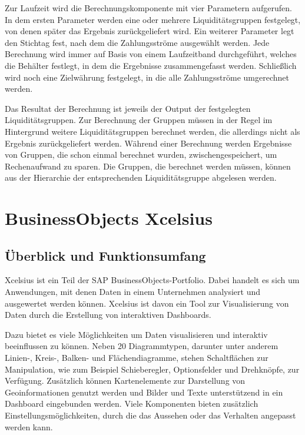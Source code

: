 \begin{onehalfspacing}
\label{sec:berechnungskomponente:parameter}
Zur Laufzeit wird die Berechnungskomponente mit vier Parametern aufgerufen. In dem ersten Parameter werden eine oder mehrere Liquiditätsgruppen festgelegt, von denen später das Ergebnis zurückgeliefert wird. Ein weiterer Parameter legt den Stichtag fest, nach dem die Zahlungsströme ausgewählt werden. Jede Berechnung wird immer auf Basis von einem Laufzeitband durchgeführt, welches die Behälter festlegt, in dem die Ergebnisse zusammengefasst werden. Schließlich wird noch eine Zielwährung festgelegt, in die alle Zahlungsströme umgerechnet werden.

Das Resultat der Berechnung ist jeweils der Output der festgelegten Liquiditätsgruppen. Zur Berechnung der Gruppen müssen in der Regel im Hintergrund weitere Liquiditätsgruppen berechnet werden, die allerdings nicht als Ergebnis zurückgeliefert werden. Während einer Berechnung werden Ergebnisse von Gruppen, die schon einmal berechnet wurden, zwischengespeichert, um Rechenaufwand zu sparen. Die Gruppen, die berechnet werden müssen, können aus der Hierarchie der entsprechenden Liquiditätsgruppe abgelesen werden.

\section{BusinessObjects Xcelsius}
\label{sec:xcelsius}
\subsection{Überblick und Funktionsumfang} 
\gls{Xcelsius} ist ein Teil der SAP BusinessObjects-Portfolio. Dabei handelt es sich um Anwendungen, mit denen Daten in einem Unternehmen analysiert und ausgewertet werden können. \gls{Xcelsius} ist davon ein Tool zur Visualisierung von Daten durch die Erstellung von interaktiven Dashboards.

Dazu bietet es viele Möglichkeiten um Daten visualisieren und interaktiv beeinflussen zu können. Neben 20 Diagrammtypen, darunter unter anderem Linien-, Kreis-, Balken-  und Flächendiagramme, stehen Schaltflächen zur Manipulation, wie zum Beispiel Schieberegler, Optionsfelder und Drehknöpfe, zur Verfügung. Zusätzlich können Kartenelemente zur Darstellung von Geoinformationen genutzt werden und Bilder und Texte unterstützend in ein Dashboard eingebunden werden. Viele Komponenten bieten zusätzlich Einstellungsmöglichkeiten, durch die das Aussehen oder das Verhalten angepasst werden kann.


\end{onehalfspacing}
